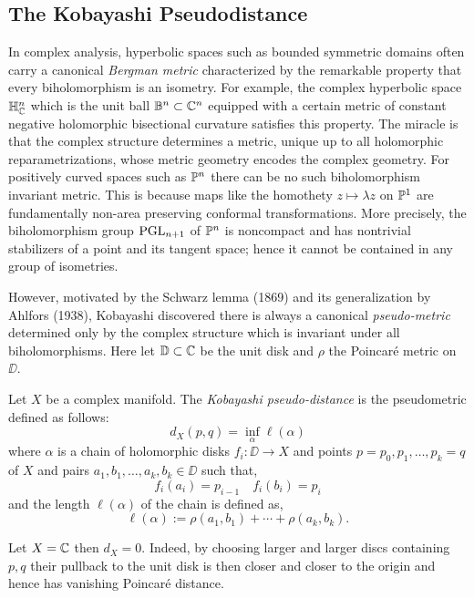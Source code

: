 \documentclass[main.tex]{subfiles}
\begin{document}
\subsection{The Kobayashi Pseudodistance}

In complex analysis, hyperbolic spaces such as bounded symmetric domains often carry a canonical \textit{Bergman metric} characterized by the remarkable property that every biholomorphism is an isometry. For example, the complex hyperbolic space $\HH^n_{\CC}$ which is the unit ball $\BB^n \subset \CC^n$ equipped with a certain metric of constant negative holomorphic bisectional curvature satisfies this property. The miracle is that the complex structure determines a metric, unique up to all holomorphic reparametrizations, whose metric geometry encodes the complex geometry. For positively curved spaces such as $\P^n$ there can be no such biholomorphism invariant metric. This is because maps like the homothety $z \mapsto \lambda z$ on $\P^1$ are fundamentally non-area preserving conformal transformations. More precisely, the biholomorphism group $\PGL_{n+1}$ of $\P^n$ is noncompact and has nontrivial stabilizers of a point and its tangent space; hence it cannot be contained in any group of isometries.
\par 
However, motivated by the Schwarz lemma (1869) and its generalization by Ahlfors (1938), Kobayashi discovered there is always a canonical \textit{pseudo-metric} determined only by the complex structure which is invariant under all biholomorphisms. Here let $\DD \subset \CC$ be the unit disk and $\rho$ the Poincar\'{e} metric on $\DD$.

\begin{defn}
Let $X$ be a complex manifold. The \textit{Kobayashi pseudo-distance} is the pseudometric defined as follows:
\[ d_X(p,q) = \inf_\alpha \ell(\alpha) \]
where $\alpha$ is a chain of holomorphic disks $f_i : \DD \to X$ and points $p = p_0, p_1, \dots, p_k = q$ of $X$ and pairs $a_1, b_1, \dots, a_k, b_k \in \DD$ such that,
\[ f_i(a_i) = p_{i-1} \quad f_i(b_i) = p_i \]
and the length $\ell(\alpha)$ of the chain is defined as,
\[ \ell(\alpha) := \rho(a_1, b_1) + \cdots + \rho(a_k, b_k). \]
\end{defn}

\begin{example}
Let $X = \CC$ then $d_X = 0$. Indeed, by choosing larger and larger discs containing $p,q$ their pullback to the unit disk is then closer and closer to the origin and hence has vanishing Poincar\'{e} distance.
\end{example}
\end{document}

